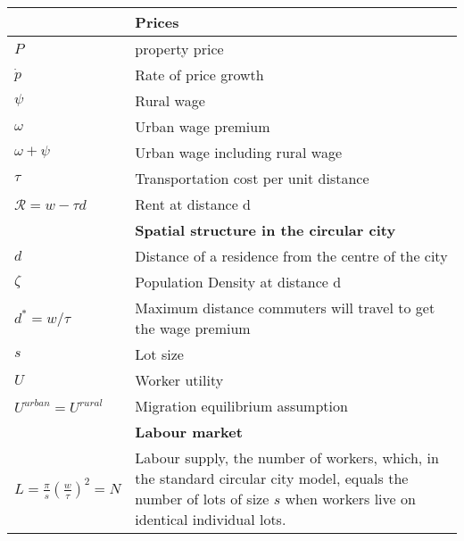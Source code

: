 \begin{longtable}{lp{10cm}}
            &  \textbf{Prices} \\ \hline
$P$         &  property price \\
$\dot p$    &  Rate of price growth \\
$\psi$      &  Rural wage \\
$\omega$         &  Urban wage premium \\
$\omega + \psi$  &  Urban wage including rural wage \\ %
$\tau$      &  Transportation cost per unit distance \\
$\mathcal{R} = w-\tau d$ & Rent at distance d  \\ 
\hline

           &\textbf{Spatial structure in the circular city} \\ \hline		
$d$        &  Distance of a residence from the centre of the city \\
$\zeta$    &  {\color{red}Population Density at distance d} \\
$d^* = w/\tau$          &  Maximum distance commuters will travel to get the wage premium \\
$s$                     &  Lot size \\
$U$                     &  Worker utility \\%
$U^{urban}=U^{rural} $  &  Migration equilibrium assumption \\
\hline

          & \textbf{Labour market} \\ \hline
$L= \frac{\pi}{s}(\frac{w}{\tau})^2 = N$  &  
Labour supply, the number of workers, which, in the standard circular city model, equals the number of lots of size $s$  when workers live on identical individual lots. %
\\  \hline


\end{longtable}
